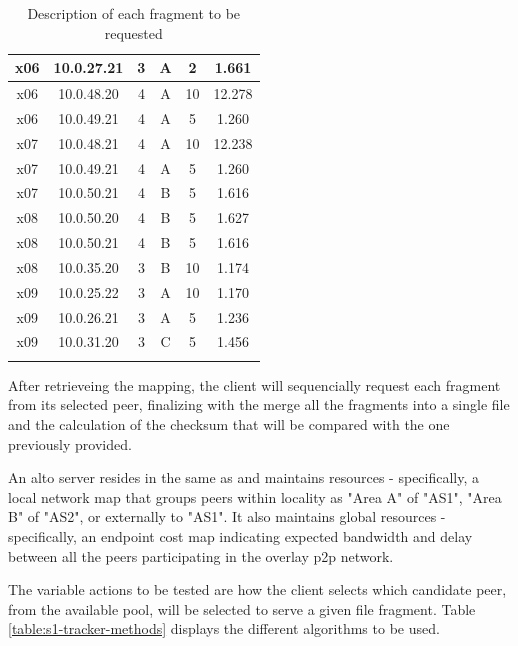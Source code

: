 \begin{table}[H]
\begin{tabular}{|c|c|c|c|c|c|}
   x06   & 10.0.27.21   & 3  &  A  & 2                & 1.661  \\ \hline
   x06   & 10.0.48.20   & 4  &  A  & 10               & 12.278 \\ \hline
   x06   & 10.0.49.21   & 4  &  A  & 5                & 1.260  \\ \thickhline

   x07   & 10.0.48.21   & 4  &  A  & 10               & 12.238 \\ \hline
   x07   & 10.0.49.21   & 4  &  A  & 5                & 1.260  \\ \hline
   x07   & 10.0.50.21   & 4  &  B  & 5                & 1.616  \\ \thickhline

   x08   & 10.0.50.20   & 4  &  B  & 5                & 1.627  \\ \hline
   x08   & 10.0.50.21   & 4  &  B  & 5                & 1.616  \\ \hline
   x08   & 10.0.35.20   & 3  &  B  & 10               & 1.174  \\ \thickhline

   x09   & 10.0.25.22   & 3  &  A  & 10               & 1.170  \\ \hline
   x09   & 10.0.26.21   & 3  &  A  & 5                & 1.236  \\ \hline
   x09   & 10.0.31.20   & 3  &  C  & 5                & 1.456  \\ \thickhline
\end{tabular}
\caption{Description of each fragment to be requested}
\label{table:fragment-allocations}
\end{table}

    After retrieveing the mapping, the client will sequencially request each fragment from its selected peer, finalizing with the merge all the fragments into a single file and the calculation of the checksum that will be compared with the one previously provided.

    An \gls{alto} server resides in the same \gls{as} and maintains resources - specifically, a local network map that groups peers within locality as "Area A" of "AS1", "Area B" of "AS2", or externally to "AS1".
    It also maintains global resources - specifically, an endpoint cost map indicating expected bandwidth and delay between all the peers participating in the overlay \gls{p2p} network.

    The variable actions to be tested are how the client selects which candidate peer, from the available pool, will be selected to serve a given file fragment.
    Table \ref{table:s1-tracker-methods} displays the different algorithms to be used.

